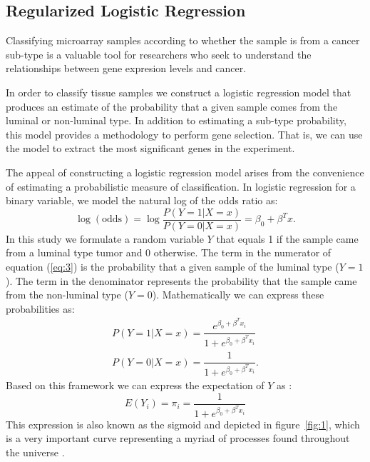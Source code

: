 \documentclass[12pt,a4paper]{article}
\begin{document}
\subsection{Regularized Logistic Regression}
Classifying microarray samples according to whether the sample is from a cancer sub-type is a valuable tool for researchers who seek to understand the relationships between gene expresion levels and cancer.\\
\par In order to classify tissue samples we construct a logistic regression model that produces an estimate of the probability that a given sample comes from the luminal or non-luminal type. In addition to estimating a sub-type probability, this model provides a methodology to perform gene selection. That is, we can use the model to extract the most significant genes in the experiment.\par
The appeal of constructing a logistic regression model arises from the convenience of estimating a probabilistic measure of classification. In logistic regression for a binary variable, we model the natural log of the odds ratio as:
\begin{equation} \label{eq:3}
\log\left(\text{odds}\right) = \log \dfrac{P\left(Y = 1 | X = x\right)}{P\left(Y = 0 | X = x\right)} = \beta_0 + \beta^T x.
\end{equation}
In this study we formulate a random variable $Y$ that equals 1 if the sample came from a luminal type tumor and 0 otherwise. The term in the numerator of equation (\ref{eq:3}) is the probability that a given sample of the luminal type ($Y = 1$). The term in the denominator represents the probability that the sample came from the non-luminal type ($Y = 0$). Mathematically we can express these probabilities as:
\begin{gather} 
\label{eq:4} P\left(Y = 1 | X = x\right) = \dfrac{e^{\beta_{0} + \beta^T x_i}}{1+e^{\beta_{0} + \beta^T x_i}}\\
\label{eq:5} P\left(Y = 0 | X = x\right) = \dfrac{1}{1+e^{\beta_{0} + \beta^T x_i}}.
\end{gather}
Based on this framework we can express the expectation of $Y$ as \cite{nachtsheim2004applied}:
\begin{equation} \label{eq:6}
E\left(Y_i\right) = \pi_i = \dfrac{1}{1+e^{\beta_{0} + \beta^T x_i}}
\end{equation}
This expression is also known as the sigmoid and depicted in figure~\ref{fig:1}, which is a very important curve representing a myriad of processes found throughout the universe \cite{domingos2015master}. 
\end{document}
